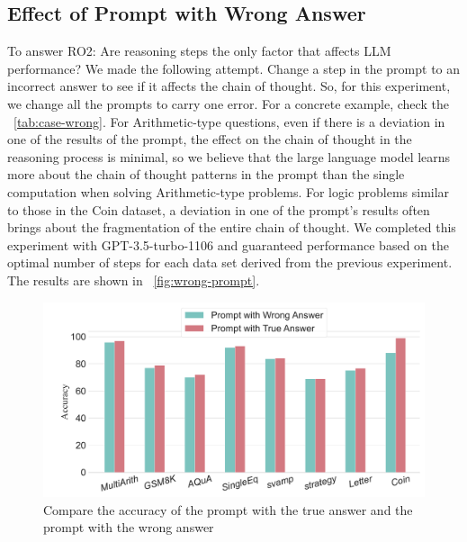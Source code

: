 \documentclass[11pt]{article}
\begin{document}
\phantom{Invisible Text}
\vspace{-\baselineskip}

\subsection{Effect of Prompt with Wrong Answer}

\label{section4.3}
%
To answer RO2: Are reasoning steps the only factor that affects LLM performance? We made the following attempt. Change a step in the prompt to an incorrect answer to see if it affects the chain of thought. So, for this experiment, we change all the prompts to carry one error. For a concrete example, check the ~\autoref{tab:case-wrong}. For Arithmetic-type questions, even if there is a deviation in one of the results of the prompt, the effect on the chain of thought in the reasoning process is minimal, so we believe that the large language model learns more about the chain of thought patterns in the prompt than the single computation when solving Arithmetic-type problems. For logic problems similar to those in the Coin dataset, a deviation in one of the prompt's results often brings about the fragmentation of the entire chain of thought. We completed this experiment with GPT-3.5-turbo-1106 and guaranteed performance based on the optimal number of steps for each data set derived from the previous experiment. The results are shown in ~\autoref{fig:wrong-prompt}.
%
\begin{figure}[t]
    \centering
    \includegraphics[width=1\linewidth]{wrong_answer.pdf}

\caption{Compare the accuracy of the prompt with the true answer and the prompt with the wrong answer}
\label{fig:wrong-prompt}

\end{figure}
\end{document}
